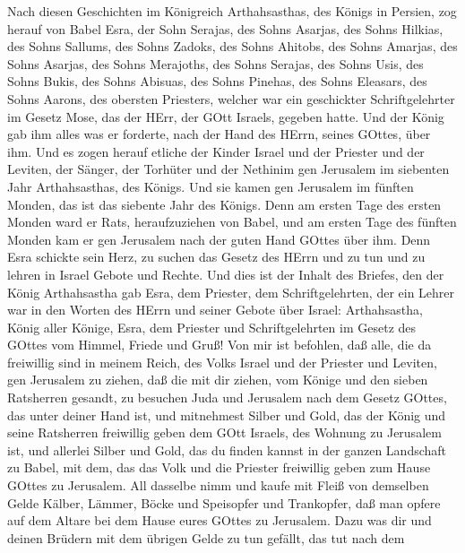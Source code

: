  Nach diesen Geschichten im Königreich Arthahsasthas, des
Königs in Persien, zog herauf von Babel Esra, der Sohn Serajas, des
Sohns Asarjas, des Sohns Hilkias,  des Sohns Sallums, des
Sohns Zadoks, des Sohns Ahitobs,  des Sohns Amarjas, des
Sohns Asarjas, des Sohns Merajoths,  des Sohns Serajas, des
Sohns Usis, des Sohns Bukis,  des Sohns Abisuas, des Sohns
Pinehas, des Sohns Eleasars, des Sohns Aarons, des obersten Priesters,
 welcher war ein geschickter Schriftgelehrter im Gesetz
Mose, das der HErr, der GOtt Israels, gegeben hatte. Und der König gab
ihm alles was er forderte, nach der Hand des HErrn, seines GOttes, über
ihm.  Und es zogen herauf etliche der Kinder Israel und der
Priester und der Leviten, der Sänger, der Torhüter und der Nethinim gen
Jerusalem im siebenten Jahr Arthahsasthas, des Königs.  Und
sie kamen gen Jerusalem im fünften Monden, das ist das siebente Jahr des
Königs.  Denn am ersten Tage des ersten Monden ward er Rats,
heraufzuziehen von Babel, und am ersten Tage des fünften Monden kam er
gen Jerusalem nach der guten Hand GOttes über ihm.  Denn
Esra schickte sein Herz, zu suchen das Gesetz des HErrn und zu tun und
zu lehren in Israel Gebote und Rechte.  Und dies ist der
Inhalt des Briefes, den der König Arthahsastha gab Esra, dem Priester,
dem Schriftgelehrten, der ein Lehrer war in den Worten des HErrn und
seiner Gebote über Israel:  Arthahsastha, König aller
Könige, Esra, dem Priester und Schriftgelehrten im Gesetz des GOttes vom
Himmel, Friede und Gruß!  Von mir ist befohlen, daß alle,
die da freiwillig sind in meinem Reich, des Volks Israel und der
Priester und Leviten, gen Jerusalem zu ziehen, daß die mit dir ziehen,
 vom Könige und den sieben Ratsherren gesandt, zu besuchen
Juda und Jerusalem nach dem Gesetz GOttes, das unter deiner Hand ist,
 und mitnehmest Silber und Gold, das der König und seine
Ratsherren freiwillig geben dem GOtt Israels, des Wohnung zu Jerusalem
ist,  und allerlei Silber und Gold, das du finden kannst in
der ganzen Landschaft zu Babel, mit dem, das das Volk und die Priester
freiwillig geben zum Hause GOttes zu Jerusalem.  All
dasselbe nimm und kaufe mit Fleiß von demselben Gelde Kälber, Lämmer,
Böcke und Speisopfer und Trankopfer, daß man opfere auf dem Altare bei
dem Hause eures GOttes zu Jerusalem.  Dazu was dir und
deinen Brüdern mit dem übrigen Gelde zu tun gefällt, das tut nach dem
